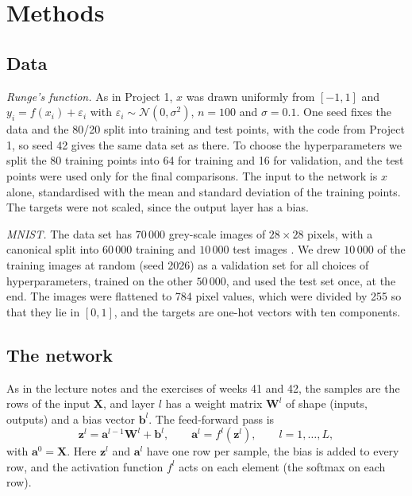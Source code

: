 
\section*{Methods}

\subsection*{Data}

\emph{Runge's function.} As in Project 1, $x$ was drawn uniformly from $[-1, 1]$ and $y_i = f(x_i) + \varepsilon_i$ with $\varepsilon_i \sim \mathcal{N}(0, \sigma^2)$, $n = 100$ and $\sigma = 0.1$. One seed fixes the data and the 80/20 split into training and test points, with the code from Project 1, so seed 42 gives the same data set as there. To choose the hyperparameters we split the 80 training points into 64 for training and 16 for validation, and the test points were used only for the final comparisons. The input to the network is $x$ alone, standardised with the mean and standard deviation of the training points. The targets were not scaled, since the output layer has a bias.

\emph{MNIST.} The data set has $70\,000$ grey-scale images of $28 \times 28$ pixels, with a canonical split into $60\,000$ training and $10\,000$ test images \cite{LeCun2010MNIST}. We drew $10\,000$ of the training images at random (seed 2026) as a validation set for all choices of hyperparameters, trained on the other $50\,000$, and used the test set once, at the end. The images were flattened to 784 pixel values, which were divided by 255 so that they lie in $[0, 1]$, and the targets are one-hot vectors with ten components.

\subsection*{The network}

As in the lecture notes \cite[Sec.~8.5]{HjorthJensen2026} and the exercises of weeks 41 and 42, the samples are the rows of the input $\mathbf{X}$, and layer $l$ has a weight matrix $\mathbf{W}^l$ of shape (inputs, outputs) and a bias vector $\mathbf{b}^l$. The feed-forward pass is
$$
\mathbf{z}^l = \mathbf{a}^{l-1}\mathbf{W}^l + \mathbf{b}^l, \qquad \mathbf{a}^l = f^l(\mathbf{z}^l), \qquad l = 1, \dots, L,
$$
with $\mathbf{a}^0 = \mathbf{X}$. Here $\mathbf{z}^l$ and $\mathbf{a}^l$ have one row per sample, the bias is added to every row, and the activation function $f^l$ acts on each element (the softmax on each row).

